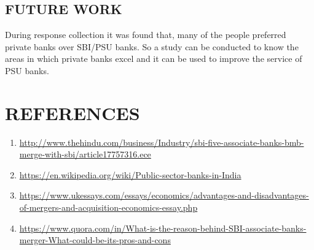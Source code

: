 \documentclass[a4paper, 14pt]{article}
\begin{document}
{\subsection{FUTURE WORK}
During response collection it was found that, many of the people preferred private banks over SBI/PSU banks. So a study can be conducted to know the areas in which private banks excel and it can be used to improve the service of PSU banks.


\newpage
\section{REFERENCES}
\begin{enumerate}
\item \href{http://www.thehindu.com/business/Industry/sbi-five-associate-banks-bmb-merge-with-sbi/article17757316.ece}{http://www.thehindu.com/business/Industry/sbi-five-associate-banks-bmb-merge-with-sbi/article17757316.ece}
\item \href{https://en.wikipedia.org/wiki/Public_sector_banks_in_India}{https://en.wikipedia.org/wiki/Public-sector-banks-in-India}
\item \href{https://www.ukessays.com/essays/economics/advantages-and-disadvantages-of-mergers-and-acquisition-economics-essay.php}{https://www.ukessays.com/essays/economics/advantages-and-disadvantages-of-mergers-and-acquisition-economics-essay.php}
\item \href{https://www.quora.com/in/What-is-the-reason-behind-SBI-associate-banks-merger-What-could-be-its-pros-and-cons}{https://www.quora.com/in/What-is-the-reason-behind-SBI-associate-banks-merger-What-could-be-its-pros-and-cons}
\end{enumerate}
}
\end{document}
